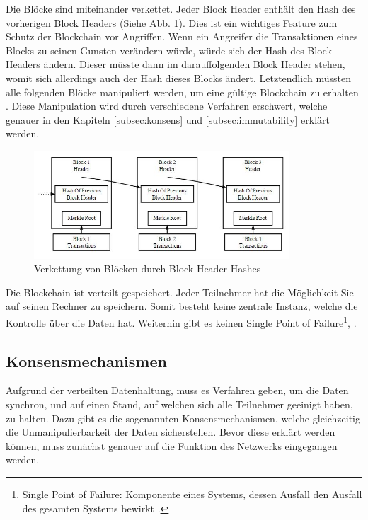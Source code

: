 Die Blöcke sind miteinander verkettet. Jeder Block Header enthält den Hash  des vorherigen Block Headers (Siehe Abb. \ref{fig:block-chain}). Dies ist ein wichtiges Feature zum Schutz der Blockchain vor Angriffen. Wenn ein Angreifer die Transaktionen eines Blocks zu seinen Gunsten verändern würde, würde sich der Hash des Block Headers ändern. Dieser müsste dann im darauffolgenden Block Header stehen, womit sich allerdings auch der Hash dieses Blocks ändert. Letztendlich müssten alle folgenden Blöcke manipuliert werden, um eine gültige Blockchain zu erhalten \cite{NakamotoBitcoinPeertoPeerElectronic2008}. Diese Manipulation wird durch verschiedene Verfahren erschwert, welche genauer in den Kapiteln \ref{subsec:konsens} und \ref{subsec:immutability} erklärt werden.

\begin{figure}[htb]
  \centering
	\includegraphics[width=0.85\textwidth,angle=0]{images/block-chain}
 	\caption{Verkettung von Blöcken durch Block Header Hashes}
	\label{fig:block-chain}
\end{figure}

Die Blockchain ist verteilt gespeichert. Jeder Teilnehmer hat die Möglichkeit Sie auf seinen Rechner zu speichern. Somit besteht keine zentrale Instanz, welche die Kontrolle über die Daten hat. Weiterhin gibt es keinen Single Point of Failure\footnote{Single Point of Failure: Komponente eines Systems, dessen Ausfall den Ausfall des gesamten Systems bewirkt \cite{SinglePointFailure2016}.},  \cite{CrosbyBlockChainTechnologyBitcoin2016}.

\label{subsec:konsens}
\subsection{Konsensmechanismen}

Aufgrund der verteilten Datenhaltung, muss es Verfahren geben, um die Daten synchron, und auf einen Stand, auf welchen sich alle Teilnehmer geeinigt haben, zu halten. Dazu gibt es die sogenannten Konsensmechanismen, welche gleichzeitig die Unmanipulierbarkeit der Daten sicherstellen. Bevor diese erklärt werden können, muss zunächst genauer auf die Funktion des Netzwerks eingegangen werden.

